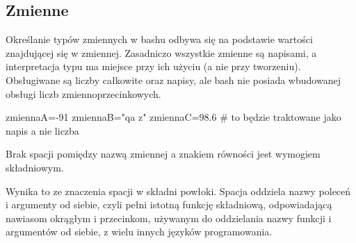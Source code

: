 % 
% 
% 
% 


\subsection{Zmienne}

Określanie typów zmiennych w bashu odbywa się na podstawie wartości znajdującej się w zmiennej.
Zasadniczo wszystkie zmienne są napisami, a interpretacja typu ma miejsce przy ich użyciu
(a nie przy tworzeniu). Obsługiwane są liczby całkowite oraz napisy,
ale bash nie posiada wbudowanej obsługi liczb zmiennoprzecinkowych.


\begin{CodeFrame*}[bash]{}
zmiennaA=-91
zmiennaB="qa   z"
zmiennaC=98.6 # to będzie traktowane jako napis a nie liczba
\end{CodeFrame*}

Brak spacji pomiędzy nazwą zmiennej a znakiem równości jest wymogiem składniowym.

Wynika to ze znaczenia spacji w składni powłoki.
Spacja oddziela nazwy poleceń i argumenty od siebie, czyli pełni istotną funkcję
składniową, odpowiadającą nawiasom okrągłym i przecinkom, używanym do oddzielania
nazwy funkcji i argumentów od siebie, z wielu innych języków programowania.

